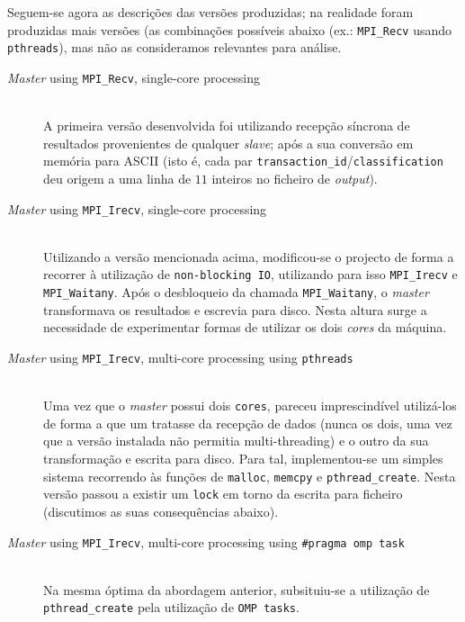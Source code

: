 \documentclass[a4paper]{article}
\begin{document}
Seguem-se agora as descrições das versões produzidas; na realidade foram produzidas mais versões (as combinações possíveis abaixo (ex.: \texttt{MPI\_Recv} usando \texttt{pthreads}), mas não as consideramos relevantes para análise.
\begin{description}
	\item[\textit{Master} using \texttt{MPI\_Recv}, single-core processing] \hfill \\
		A primeira versão desenvolvida foi utilizando recepção síncrona de resultados provenientes de qualquer \textit{slave}; após a sua conversão em memória para ASCII (isto é, cada par \texttt{transaction\_id}/\texttt{classification} deu origem a uma linha de $11$ inteiros no ficheiro de \textit{output}).

	\item[\textit{Master} using \texttt{MPI\_Irecv}, single-core processing] \hfill \\
		Utilizando a versão mencionada acima, modificou-se o projecto de forma a recorrer à utilização de \texttt{non-blocking IO}, utilizando para isso \texttt{MPI\_Irecv} e \texttt{MPI\_Waitany}. Após o desbloqueio da chamada \texttt{MPI\_Waitany}, o \textit{master} transformava os resultados e escrevia para disco. Nesta altura surge a necessidade de experimentar formas de utilizar os dois \textit{cores} da máquina.

	\item[\textit{Master} using \texttt{MPI\_Irecv}, multi-core processing using \texttt{pthreads}] \hfill \\
		Uma vez que o \textit{master} possui dois \texttt{cores}, pareceu imprescindível utilizá-los de forma a que um tratasse da recepção de dados (nunca os dois, uma vez que a versão instalada não permitia multi-threading) e o outro da sua transformação e escrita para disco. Para tal, implementou-se um simples sistema recorrendo às funções de \texttt{malloc}, \texttt{memcpy} e \texttt{pthread\_create}. Nesta versão passou a existir um \texttt{lock} em torno da escrita para ficheiro (discutimos as suas consequências abaixo).

	\item[\textit{Master} using \texttt{MPI\_Irecv}, multi-core processing using \texttt{\#pragma omp task}] \hfill \\
		Na mesma óptima da abordagem anterior, subsituiu-se a utilização de \texttt{pthread\_create} pela utilização de \texttt{OMP tasks}.
\end{description}
\clearpage
\end{document}
